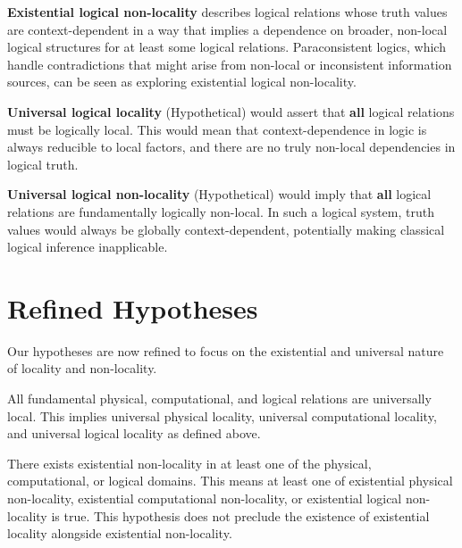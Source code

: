 	\begin{definition}
		\textbf{Existential logical non-locality} describes logical relations whose truth values are context-dependent in a way that implies a dependence on broader, non-local logical structures for at least some logical relations. Paraconsistent logics, which handle contradictions that might arise from non-local or inconsistent information sources, can be seen as exploring existential logical non-locality.
	\end{definition}

	\begin{definition}
		\textbf{Universal logical locality} (Hypothetical) would assert that \textbf{all} logical relations must be logically local. This would mean that context-dependence in logic is always reducible to local factors, and there are no truly non-local dependencies in logical truth.
	\end{definition}

	\begin{definition}
		\textbf{Universal logical non-locality} (Hypothetical) would imply that \textbf{all} logical relations are fundamentally logically non-local. In such a logical system, truth values would always be globally context-dependent, potentially making classical logical inference inapplicable.
	\end{definition}

	\section{Refined Hypotheses}

	Our hypotheses are now refined to focus on the existential and universal nature of locality and non-locality.
	
	\begin{hypothesis}
		All fundamental physical, computational, and logical relations are universally local.  This implies universal physical locality, universal computational locality, and universal logical locality as defined above.
	\end{hypothesis}
	
	\begin{hypothesis}
		There exists existential non-locality in at least one of the physical, computational, or logical domains.  This means at least one of existential physical non-locality, existential computational non-locality, or existential logical non-locality is true.  This hypothesis does not preclude the existence of existential locality alongside existential non-locality.
	\end{hypothesis}
	
